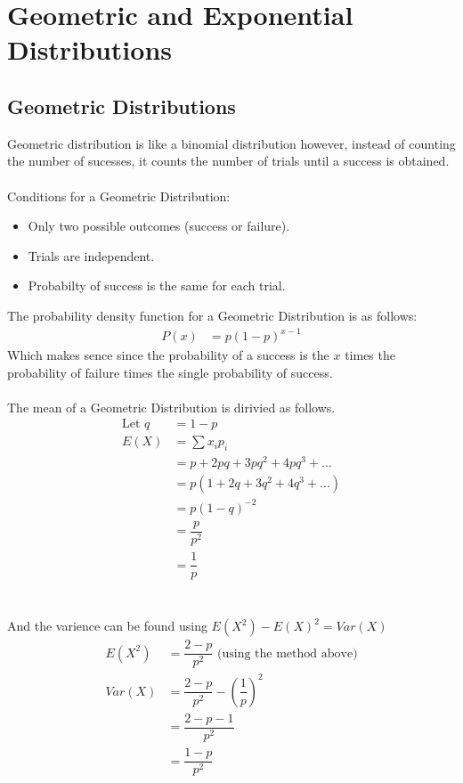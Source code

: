 
\section{Geometric and Exponential Distributions}
    
    \subsection{Geometric Distributions}
        Geometric distribution is like a binomial distribution however, instead of counting the number of sucesses, it counts the number of trials until a success is obtained.
        \\\\
        Conditions for a Geometric Distribution:
        \begin{itemize}
        \item Only two possible outcomes (success or failure).
        \item Trials are independent.
        \item Probabilty of success is the same for each trial.
        \end{itemize}
        The probability density function for a Geometric Distribution is as follows:
        \begin{align*}
        P(x) &= p(1-p)^{x-1}
        \end{align*}
        Which makes sence since the probability of a success is the $x$ times the probability of failure times the single probability of success.
        \\\\
        The mean of a Geometric Distribution is dirivied as follows.
        \begin{align*}
        \text{Let }q &= 1-p                     \\
        E(X) &= \sum{x_i p_i}                   \\
             &= p + 2pq + 3pq^2 + 4pq^3 + ...   \\
             &= p(1 + 2q + 3q^2 + 4q^3 + ...)   \\
             &= p(1-q)^{-2}                     \\
             &= \dfrac{p}{p^2}                  \\
             &= \dfrac{1}{p}
        \end{align*}
        \\\\
        And the varience can be found using $E(X^2) - E(X)^2 = Var(X)$
        \begin{align*}
        E(X^2) &= \dfrac{2-p}{p^2} \text{  (using the method above)}    \\
        Var(X) &= \dfrac{2-p}{p^2} - \left(\dfrac{1}{p}\right)^2        \\
               &= \dfrac{2-p-1}{p^2}                                    \\
               &= \dfrac{1-p}{p^2}                                      \\
        \end{align*}

